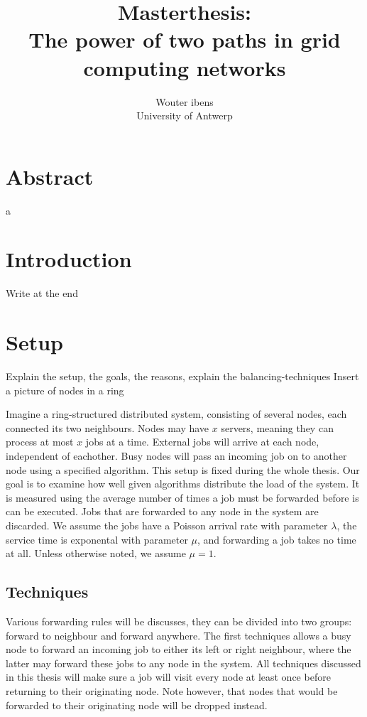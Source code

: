 \documentclass[10pt,a4paper,titlepage]{article}
\author{Wouter ibens \\ University of Antwerp}
\title{Masterthesis:\\ The power of two paths in grid computing networks}
\begin{document}
\maketitle

\section*{Abstract}
a

\newpage

\tableofcontents

\newpage

\section*{Introduction}
Write at the end


\section{Setup}
Explain the setup, the goals, the reasons, explain the balancing-techniques
Insert a picture of nodes in a ring

Imagine a ring-structured distributed system, consisting of several nodes, each connected its two neighbours. Nodes may have $x$ servers, meaning they can process at most $x$ jobs at a time. External jobs will arrive at each node, independent of eachother. Busy nodes will pass an incoming job on to another node using a specified algorithm. This setup is fixed during the whole thesis. Our goal is to examine how well given algorithms distribute the load of the system. It is measured using the average number of times a job must be forwarded before is can be executed. Jobs that are forwarded to any node in the system are discarded. We assume the jobs have a Poisson arrival rate with parameter $\lambda$, the service time is exponental with parameter $\mu$, and forwarding a job takes no time at all. Unless otherwise noted, we assume $\mu=1$.

\subsection{Techniques}
Various forwarding rules will be discusses, they can be divided into two groups: forward to neighbour and forward anywhere. The first techniques allows a busy node to forward an incoming job to either its left or right neighbour, where the latter may forward these jobs to any node in the system. All techniques discussed in this thesis will make sure a job will visit every node at least once before returning to their originating node. Note however, that nodes that would be forwarded to their originating node will be dropped instead.
\end{document}

